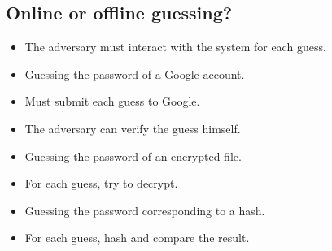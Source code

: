 \subsection{Online or offline guessing?}

\begin{frame}
  \begin{definition}[Online]
    \begin{itemize}
      \item The adversary must interact with the system for each guess.
    \end{itemize}
  \end{definition}

  \pause

  \begin{example}[Online]
    \begin{itemize}
      \item Guessing the password of a Google account.
      \item Must submit each guess to Google.
    \end{itemize}
  \end{example}
\end{frame}

\begin{frame}
  \begin{definition}[Offline]
    \begin{itemize}
      \item The adversary can verify the guess himself.
    \end{itemize}
  \end{definition}

  \pause

  \begin{example}[Offline]
    \begin{itemize}
      \item Guessing the password of an encrypted file.
      \item For each guess, try to decrypt.
    \end{itemize}
  \end{example}

  \begin{example}[Offline]
    \begin{itemize}
      \item Guessing the password corresponding to a hash.
      \item For each guess, hash and compare the result.
    \end{itemize}
  \end{example}
\end{frame}

